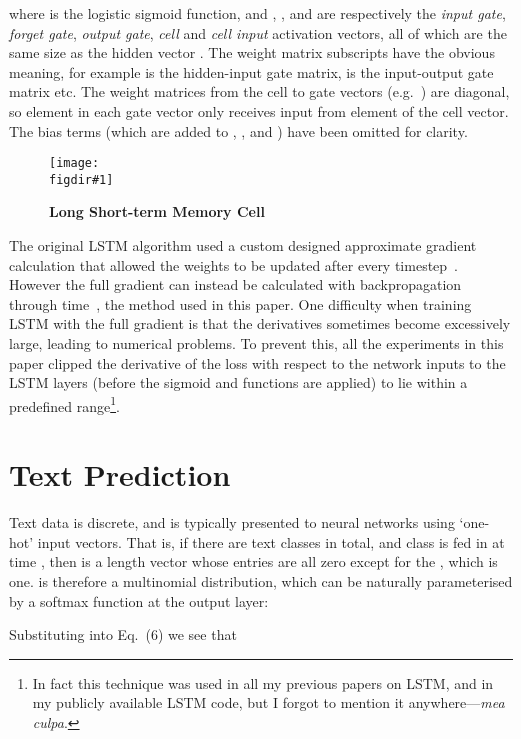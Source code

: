 \documentclass{article}
\newcommand{\eg}{e.g.\ }
\newcommand{\flabel}[1]{\label{fig:#1}}
\newcommand{\seclabel}[1]{\label{sec:#1}}
\newcommand{\figdir}{}
\newcommand{\capt}[2]{\caption[#1]{\textbf{#1}#2}}
\newcommand{\fig}[5]
{
\begin{figure}
\begin{center}
\texttt{[image: \\figdir\#1]}
\end{center}
\capt{#4}{#5}
\flabel{#2}
\end{figure}
}
\begin{document}
where  is the logistic sigmoid function, and , ,  and  are respectively the \emph{input gate}, \emph{forget gate}, \emph{output gate}, \emph{cell} and \emph{cell input} activation vectors, all of which are the same size as the hidden vector .
The weight matrix subscripts have the obvious meaning, for example  is the hidden-input gate matrix,  is the input-output gate matrix etc.
The weight matrices from the cell to gate vectors (\eg ) are diagonal, so element  in each gate vector only receives input from element  of the cell vector.
The bias terms (which are added to , ,  and ) have been omitted for clarity.

\fig{lstm_variables}{lstm}{0.8}{Long Short-term Memory Cell}{}

The original LSTM algorithm used a custom designed approximate gradient calculation that allowed the weights to be updated after every timestep~\cite{hochreiter97lstm}.
However the full gradient can instead be calculated with backpropagation through time~\cite{graves05nn}, the method used in this paper.
One difficulty when training LSTM with the full gradient is that the derivatives sometimes become excessively large, leading to numerical problems.
To prevent this, all the experiments in this paper clipped the derivative of the loss with respect to the network inputs to the LSTM layers (before the sigmoid and  functions are applied) to lie within a predefined range\footnote{In fact this technique was used in all my previous papers on LSTM, and in my publicly available LSTM code, but I forgot to mention it anywhere---\emph{mea culpa}.}.

\section{Text Prediction}
\seclabel{text}
Text data is discrete, and is typically presented to neural networks using `one-hot' input vectors.
That is, if there are  text classes in total, and class  is fed in at time , then  is a length  vector whose entries are all zero except for the , which is one.
 is therefore a multinomial distribution, which can be naturally parameterised by a softmax function at the output layer:

Substituting into Eq.~(6) we see that
\end{document}
